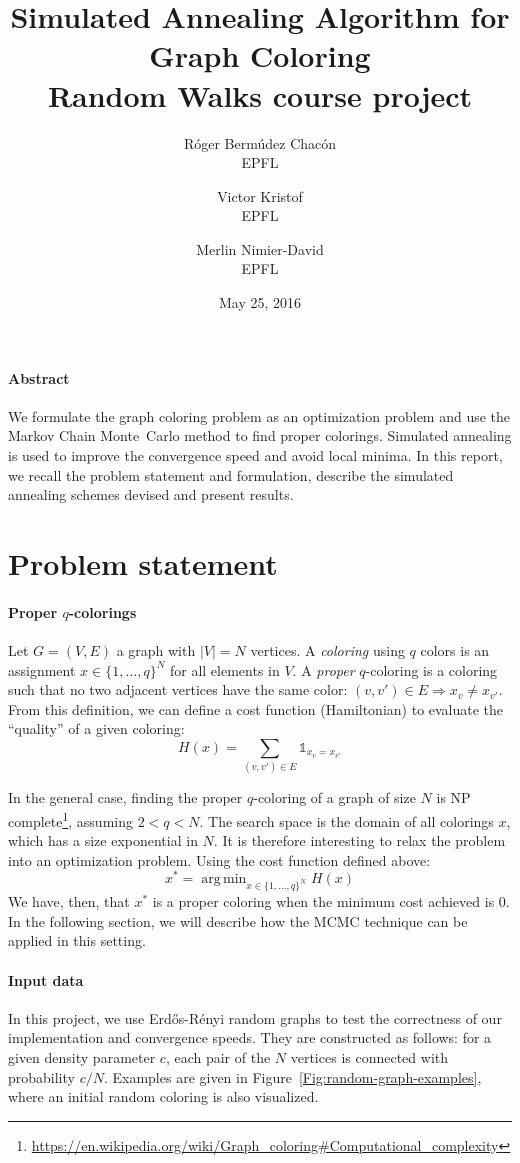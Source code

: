 \documentclass{article}
\title{Simulated Annealing Algorithm for Graph Coloring\\Random Walks course project}
\date{May 25, 2016}
\author{
  R\'oger Berm\'udez Chac\'on\\EPFL
  \and
  Victor Kristof\\EPFL
  \and
  Merlin Nimier-David\\EPFL
}
\DeclareMathOperator*{\argmin}{arg\,min}
\begin{document}
  \maketitle

  \paragraph{Abstract}
  We formulate the graph coloring problem as an optimization problem and use the Markov Chain Monte~Carlo method to find proper colorings. Simulated annealing is used to improve the convergence speed and avoid local minima. In this report, we recall the problem statement and formulation, describe the simulated annealing schemes devised and present results.

  \section*{Problem statement}
  \paragraph{Proper $q$-colorings}
  Let $G = (V, E)$ a graph with $|V| = N$ vertices. A \emph{coloring} using $q$ colors is an assignment $x \in \{ 1, \ldots, q \}^N$ for all elements in $V$. A \emph{proper} $q$-coloring is a coloring such that no two adjacent vertices have the same color: $(v, v') \in E \Rightarrow x_v \neq x_{v'}$. From this definition, we can define a cost function (Hamiltonian) to evaluate the ``quality'' of a given coloring:
  \[
    H(x) = \sum_{(v, v') \in E} \mathbb{1}_{x_v = x_{v'}}
  \]

  In the general case, finding the proper $q$-coloring of a graph of size $N$ is NP complete\footnote{\url{https://en.wikipedia.org/wiki/Graph_coloring\#Computational_complexity}}, assuming $2 < q < N$. The search space is the domain of all colorings $x$, which has a size exponential in $N$. It is therefore interesting to relax the problem into an optimization problem. Using the cost function defined above:
  \[
    x^* = \argmin_{x \in \{ 1, \ldots, q \}^N} H(x)
  \]
  We have, then, that $x^*$ is a proper coloring when the minimum cost achieved is $0$. In the following section, we will describe how the MCMC technique can be applied in this setting.

  \paragraph{Input data}
  In this project, we use Erd\H{o}s-R\'{e}nyi random graphs to test the correctness of our implementation and convergence speeds. They are constructed as follows: for a given density parameter $c$, each pair of the $N$ vertices is connected with probability $c / N$. Examples are given in Figure~\ref{Fig:random-graph-examples}, where an initial random coloring is also visualized.
\end{document}
